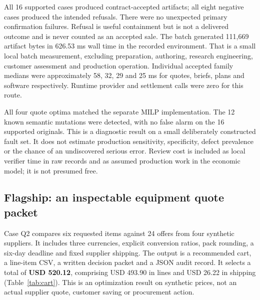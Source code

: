 All 16 supported cases produced contract-accepted artifacts; all eight negative cases produced the intended refusals. There were no unexpected primary confirmation failures. Refusal is useful containment but is not a delivered outcome and is never counted as an accepted sale. The batch generated 111,669 artifact bytes in 626.53 ms wall time in the recorded environment. That is a small local batch measurement, excluding preparation, authoring, research engineering, customer assessment and production operation. Individual accepted family medians were approximately 58, 32, 29 and 25 ms for quotes, briefs, plans and software respectively. Runtime provider and settlement calls were zero for this route.

All four quote optima matched the separate MILP implementation. The 12 known semantic mutations were detected, with no false alarm on the 16 supported originals. This is a diagnostic result on a small deliberately constructed fault set. It does not estimate production sensitivity, specificity, defect prevalence or the chance of an undiscovered serious error. Review cost is included as local verifier time in raw records and as assumed production work in the economic model; it is not presumed free.

\subsection{Flagship: an inspectable equipment quote packet}

Case Q2 compares six requested items against 24 offers from four synthetic suppliers. It includes three currencies, explicit conversion ratios, pack rounding, a six-day deadline and fixed supplier shipping. The output is a recommended cart, a line-item CSV, a written decision packet and a JSON audit record. It selects a total of \textbf{USD 520.12}, comprising USD 493.90 in lines and USD 26.22 in shipping (Table~\ref{tab:cart}). This is an optimization result on synthetic prices, not an actual supplier quote, customer saving or procurement action.

